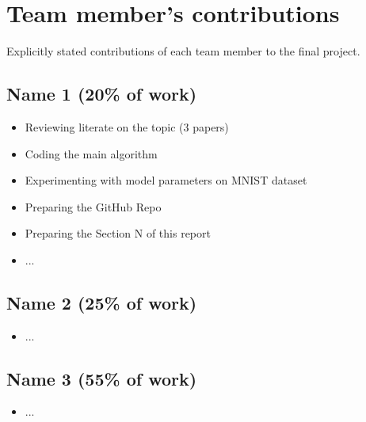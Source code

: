 \documentclass{article}
\begin{document}


\clearpage


\newpage
\appendix
\section{Team member's contributions}
\label{appendix-contrib}
Explicitly stated contributions of each team member to the final project.
\subsection*{Name 1 (20\% of work)}
\begin{itemize}
    \item Reviewing literate on the topic (3 papers)
    \item Coding the main algorithm
    \item Experimenting with model parameters on MNIST dataset
    \item Preparing the GitHub Repo
    \item Preparing the Section N of this report
    \item ...
\end{itemize}

\subsection*{Name 2 (25\% of work)}
\begin{itemize}
    \item ...
\end{itemize}

\subsection*{Name 3 (55\% of work)}
\begin{itemize}
    \item ...
\end{itemize}

\clearpage
\end{document}
